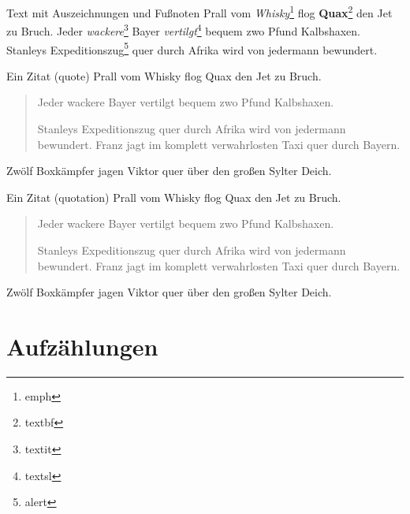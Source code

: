 	\begin{frame}{Text mit Auszeichnungen und Fußnoten}
		Prall vom \emph{Whisky}\footnote{emph} flog \textbf{Quax}\footnote{textbf} den Jet zu Bruch.
		Jeder \textit{wackere}\footnote{textit} Bayer \textsl{vertilgt}\footnote{textsl} bequem zwo Pfund Kalbshaxen.
		Stanleys \alert{Expeditionszug}\footnote{alert} quer durch Afrika wird von jedermann bewundert.
	\end{frame}


	\begin{frame}{Ein Zitat (quote)}
		Prall vom Whisky flog Quax den Jet zu Bruch.

		\begin{quote}
			Jeder wackere Bayer vertilgt bequem zwo Pfund Kalbshaxen.

			Stanleys Expeditionszug quer durch Afrika wird von jedermann bewundert.
			Franz jagt im komplett verwahrlosten Taxi quer durch Bayern.
		\end{quote}

		Zwölf Boxkämpfer jagen Viktor quer über den großen Sylter Deich.
	\end{frame}


	\begin{frame}{Ein Zitat (quotation)}
		Prall vom Whisky flog Quax den Jet zu Bruch.

		\begin{quotation}
			Jeder wackere Bayer vertilgt bequem zwo Pfund Kalbshaxen.

			Stanleys Expeditionszug quer durch Afrika wird von jedermann bewundert.
			Franz jagt im komplett verwahrlosten Taxi quer durch Bayern.
		\end{quotation}

		Zwölf Boxkämpfer jagen Viktor quer über den großen Sylter Deich.
	\end{frame}


	\section{Aufzählungen}

